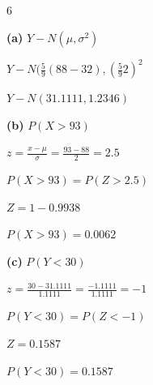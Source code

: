\documentclass[12 pt]{article}
\begin{document}
    \begin{exercise}{6}
    \hfill

    \textbf{(a)} $Y - N(\mu, \sigma^2)$

    $Y - N(\frac{5}{9}(88-32), (\frac{5}{9} 2)^2$

    $Y - N(31.1111, 1.2346)$

    \hfill

    \textbf{(b)} $P(X > 93)$

    $z = \frac{x - \mu}{\sigma} = \frac{93-88}{2} = 2.5$

    $P(X > 93) = P(Z > 2.5)$

    $Z = 1 - 0.9938$

    $P(X > 93) = 0.0062$

    \textbf{(c)} $P(Y < 30)$

    $z = \frac{30 - 31.1111}{1.1111} = \frac{-1.1111}{1.1111} = -1$

    $P(Y < 30) = P(Z < -1)$

    $Z = 0.1587$

    $P(Y < 30) = 0.1587$

    \hfill
    \end{exercise}
\end{document}
